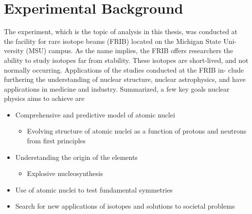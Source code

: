 \section{Experimental Background}\label{sec:experimental-background}
The experiment, which is the topic of analysis in this thesis, was conducted at
the facility for rare isotope beams (FRIB) located on the Michigan State Uni-
versity (MSU) campus. As the name implies, the FRIB offers researchers the
ability to study isotopes far from stability. These isotopes are short-lived, and
not normally occurring. Applications of the studies conducted at the FRIB in-
clude furthering the understanding of nuclear structure, nuclear astrophysics,
and have applications in medicine and industry. Summarized, a few key goals nuclear 
physics aims to achieve are
\begin{itemize}
	\item Comprehensive and predictive model of atomic nuclei
	\begin{itemize}
		\item Evolving structure of atomic nuclei as a function of protons and neutrons from first principles
	\end{itemize}
	\item Understanding the origin of the elements
	\begin{itemize}
		\item Explosive nucleosynthesis
	\end{itemize}
	\item Use of atomic nuclei to test fundamental symmetries
	\item Search for new applications of isotopes and solutions to societal problems
\end{itemize}


